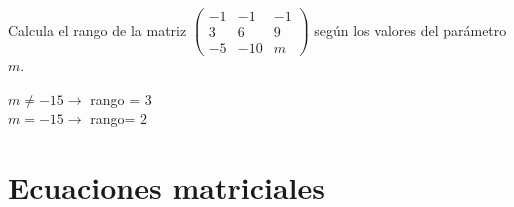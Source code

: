 \begin{ejer}
 Calcula el rango de la matriz $\begin{pmatrix}
-1 & -1 & -1 \\
3 & 6 & 9 \\
-5 & -10 & m
\end{pmatrix}$ 
según los valores del parámetro $m$.
\begin{solu}
$m \neq -15 \rightarrow $ rango = $3$ \\ $m = -15 \rightarrow $ rango= $2$
\end{solu}
\end{ejer}


\section{Ecuaciones matriciales}

